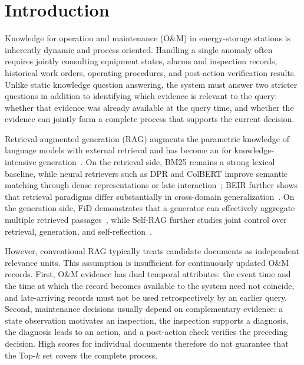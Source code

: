 \section{Introduction}
\label{sec:introduction}

Knowledge for operation and maintenance (O\&M) in energy-storage stations is inherently dynamic and process-oriented. Handling a single anomaly often requires jointly consulting equipment states, alarms and inspection records, historical work orders, operating procedures, and post-action verification results. Unlike static knowledge question answering, the system must answer two stricter questions in addition to identifying which evidence is relevant to the query: whether that evidence was already available at the query time, and whether the evidence can jointly form a complete process that supports the current decision.

Retrieval-augmented generation (RAG) augments the parametric knowledge of language models with external retrieval and has become an  for knowledge-intensive generation~\cite{lewis2020rag}. On the retrieval side, BM25 remains a strong lexical baseline, while neural retrievers such as DPR and ColBERT improve semantic matching through dense representations or late interaction~\cite{karpukhin2020dpr,khattab2020colbert}; BEIR further shows that retrieval paradigms differ substantially in cross-domain generalization~\cite{thakur2021beir}. On the generation side, FiD demonstrates that a generator can effectively aggregate multiple retrieved passages~\cite{izacard2021fid}, while Self-RAG further studies joint control over retrieval, generation, and self-reflection~\cite{asai2024selfrag}.

However, conventional RAG typically treats candidate documents as independent relevance units. This assumption is insufficient for continuously updated O\&M records. First, O\&M evidence has dual temporal attributes: the event time and the time at which the record becomes available to the system need not coincide, and late-arriving records must not be used retrospectively by an earlier query. Second, maintenance decisions usually depend on complementary evidence: a state observation motivates an inspection, the inspection supports a diagnosis, the diagnosis leads to an action, and a post-action check verifies the preceding decision. High scores for individual documents therefore do not guarantee that the Top-$k$ set covers the complete process.

